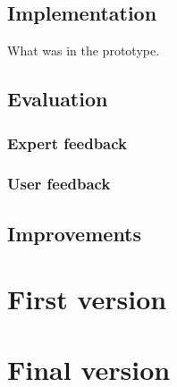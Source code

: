 \documentclass[11pt]{report}
\begin{document}
\section{Implementation}
What was in the prototype.
\section{Evaluation}
\subsection{Expert feedback}
\subsection{User feedback}
\section{Improvements}

\chapter{First version}

\chapter{Final version}
\end{document}
